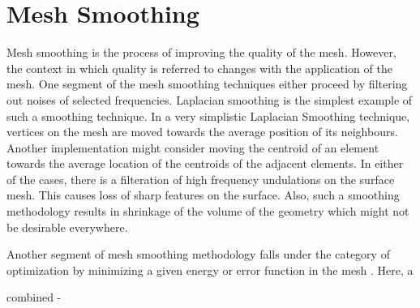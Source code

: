 \section{Mesh Smoothing}

Mesh smoothing is the process of improving the quality of the mesh. However, the context in which quality is referred to changes with the application of the mesh. One segment of the mesh smoothing techniques either proceed by filtering out noises of selected frequencies. Laplacian smoothing is the simplest example of such a smoothing technique. In a very simplistic Laplacian Smoothing technique, vertices on the mesh are moved towards the average position of its neighbours. Another implementation might consider moving the centroid of an element towards the average location of the centroids of the adjacent elements. In either of the cases, there is a filteration of high frequency undulations on the surface mesh. This causes loss of sharp features on the surface. Also, such a smoothing methodology results in shrinkage of the volume of the geometry which might not be desirable everywhere.

Another segment of mesh smoothing methodology falls under the category of optimization by minimizing a given energy or error function in the mesh \cite{freitag1997tetrahedral, zhou2000angle, chen2004mesh, parthasarathy1991constrained, shephard1991automatic}. Here, a  

combined - \cite{freitag1997combining, canann1998approach}
